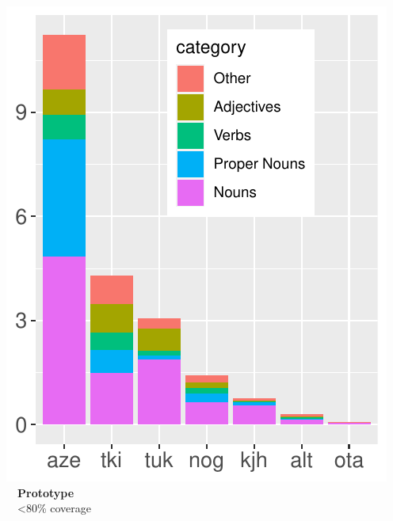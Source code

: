 \documentclass[a0paper,fleqn]{betterposter}
\begin{document}
{\begin{minipage}{0.317\textwidth}
    \includegraphics[width=\textwidth]{img/lgs3}\vspace{-0.8em}\\
    {\color{lightred}~~\textbf{Prototype}}\\
    ~~<80\% coverage
\end{minipage}



}
\end{document}
